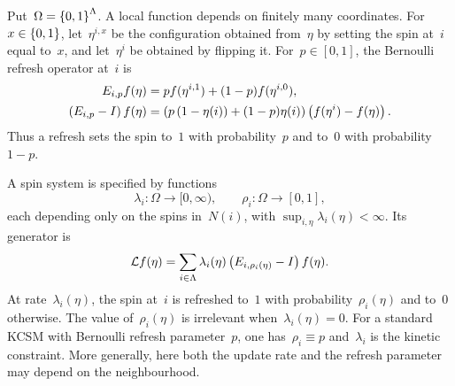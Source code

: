 Put~$\Omega=\left\{0,1\right\}^{\Lambda}$. A local function depends on finitely many
coordinates. For~$x\in\left\{0,1\right\}$, let~$\eta^{i,x}$ be the configuration obtained
from~$\eta$  by setting the spin at~$i$ equal to~$x$, and let~$\eta^i$ be obtained
by flipping it. For~$p\in[0,1]$, the Bernoulli refresh operator at~$i$ is
\begin{align*}
E_{i,p}f(\eta)
&=
pf(\eta^{i,1})+(1-p)f(\eta^{i,0}),
\\
\left(E_{i,p}-I\right)f(\eta)
&=
\left(p\left(1-\eta(i)\right)+(1-p)\eta(i)\right)
\left(f(\eta^i)-f(\eta)\right).
\end{align*}
Thus a refresh sets the spin to~$1$ with probability~$p$ and to~$0$ with
probability~$1-p$.


A spin system is specified by functions 
\begin{equation*}
\lambda_i:\Omega\to[0,\infty),
\qquad
\rho_i:\Omega\to[0,1],
\end{equation*}
each depending only on the spins in~$N(i)$, with
$\sup_{i,\eta}\lambda_i(\eta)<\infty$. Its generator is 
\begin{equation}
\label{eq:spin-generator}
\mathcal{L} f(\eta)
=
\sum_{i\in\Lambda}
\lambda_i(\eta)\left(E_{i,\rho_i(\eta)}-I\right)f(\eta).
\end{equation}
 At rate~$\lambda_i(\eta)$, the spin at~$i$ is refreshed to~$1$ with
probability~$\rho_i(\eta)$ and to~$0$ otherwise. The value of~$\rho_i(\eta)$ is
irrelevant when~$\lambda_i(\eta)=0$.   For a standard KCSM with Bernoulli refresh
parameter~$p$, one has~$\rho_i\equiv p$ and~$\lambda_i$ is the kinetic
constraint. More generally, here both the update rate and the refresh parameter
may depend on the neighbourhood.

